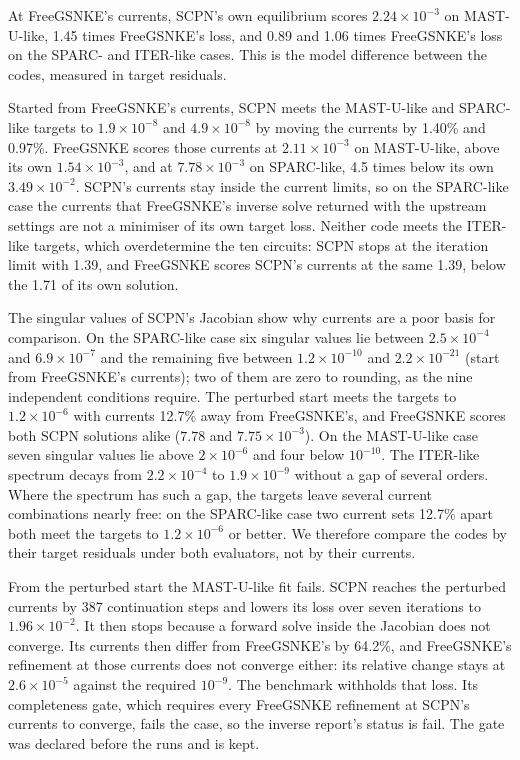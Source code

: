 \documentclass[11pt]{article}
\begin{document}
At FreeGSNKE's currents, SCPN's own equilibrium scores $2.24 \times 10^{-3}$ on
MAST-U-like, 1.45 times FreeGSNKE's loss, and 0.89 and 1.06 times FreeGSNKE's
loss on the SPARC- and ITER-like cases.  This is the model difference between
the codes, measured in target residuals.

Started from FreeGSNKE's currents, SCPN meets the MAST-U-like and SPARC-like
targets to $1.9 \times 10^{-8}$ and $4.9 \times 10^{-8}$ by moving the currents by
1.40\% and 0.97\%.  FreeGSNKE scores those currents at $2.11 \times 10^{-3}$ on
MAST-U-like, above its own $1.54 \times 10^{-3}$, and at $7.78 \times 10^{-3}$ on
SPARC-like, 4.5 times below its own $3.49 \times 10^{-2}$.  SCPN's currents stay inside the current limits, so on the
SPARC-like case the currents that FreeGSNKE's inverse solve returned with the
upstream settings are not a minimiser of its own target loss.  Neither code meets the ITER-like
targets, which overdetermine the ten circuits: SCPN stops at the iteration
limit with 1.39, and FreeGSNKE scores SCPN's currents at the same 1.39, below
the 1.71 of its own solution.

The singular values of SCPN's Jacobian show why currents are a poor basis for
comparison.  On the SPARC-like case six singular values lie between
$2.5 \times 10^{-4}$ and $6.9 \times 10^{-7}$ and the remaining five between
$1.2 \times 10^{-10}$ and $2.2 \times 10^{-21}$ (start from FreeGSNKE's currents);
two of them are zero to rounding, as the nine independent conditions require.  The perturbed start meets the
targets to $1.2 \times 10^{-6}$ with currents 12.7\% away from FreeGSNKE's, and
FreeGSNKE scores both SCPN solutions alike ($7.78$ and
$7.75 \times 10^{-3}$).  On the MAST-U-like case seven singular values lie above
$2 \times 10^{-6}$ and four below $10^{-10}$.  The ITER-like spectrum decays from
$2.2 \times 10^{-4}$ to $1.9 \times 10^{-9}$ without a gap of several orders.
Where the spectrum has such a gap, the targets leave several current
combinations nearly free: on the SPARC-like case two current sets 12.7\% apart
both meet the targets to $1.2 \times 10^{-6}$ or better.  We therefore compare the codes by their target
residuals under both evaluators, not by their currents.

From the perturbed start the MAST-U-like fit fails.  SCPN reaches the
perturbed currents by 387 continuation steps and lowers its loss over seven
iterations to $1.96 \times 10^{-2}$.  It then stops because a forward solve
inside the Jacobian does not converge.  Its currents then differ from
FreeGSNKE's by 64.2\%, and FreeGSNKE's refinement at those currents does not
converge either: its relative change stays at $2.6 \times 10^{-5}$ against the
required $10^{-9}$.  The benchmark withholds that loss.  Its completeness gate,
which requires every FreeGSNKE refinement at SCPN's currents to converge,
fails the case, so the inverse report's status is fail.  The gate was declared
before the runs and is kept.
\end{document}
